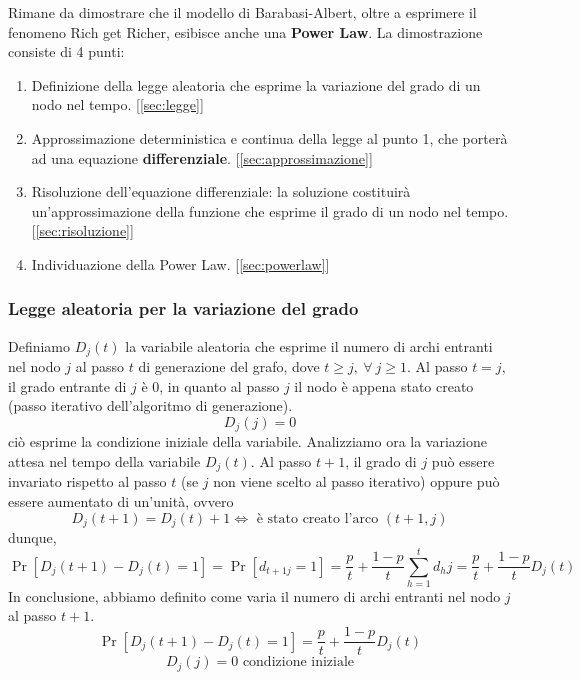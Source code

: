 Rimane da dimostrare che il modello di Barabasi-Albert, oltre a esprimere il fenomeno Rich get Richer, esibisce anche una \textbf{Power Law}. La dimostrazione consiste di 4 punti:
\begin{enumerate}
    \item Definizione della legge aleatoria che esprime la variazione del grado di un nodo nel tempo. [\autoref{sec:legge}]
    \item Approssimazione deterministica e continua della legge al punto 1, che porterà ad una equazione \textbf{differenziale}. [\autoref{sec:approssimazione}]
    \item Risoluzione dell'equazione differenziale: la soluzione costituirà un'approssimazione della funzione che esprime il grado di un nodo nel tempo. [\autoref{sec:risoluzione}]
    \item Individuazione della Power Law. [\autoref{sec:powerlaw}]
\end{enumerate}

\newpage

\subsubsection{Legge aleatoria per la variazione del grado}\label{sec:legge}
\vspace{0.5cm}

\begin{definizione}
    Definiamo $D_j(t)$ la variabile aleatoria che esprime il numero di archi entranti nel nodo $j$ al passo $t$ di generazione del grafo, dove $t \geq j,\ \forall\ j \geq 1$.
    Al passo $t=j$, il grado entrante di $j$ è 0, in quanto al passo $j$ il nodo è appena stato creato (passo iterativo dell'algoritmo di generazione). 
    \[
    D_j(j) = 0
    \]
    ciò esprime la condizione iniziale della variabile.
    Analizziamo ora la variazione attesa nel tempo della variabile $D_j(t)$. Al passo $t+1$, il grado di $j$ può essere invariato rispetto al passo $t$ (se $j$ non viene scelto al passo iterativo) oppure può essere aumentato di un'unità, ovvero
    \[
    D_j(t+1) = D_j(t) + 1 \iff \text{ è stato creato l'arco } (t+1, j)
    \]
    dunque,
    \[
    \Pr[D_j(t+1) - D_j(t) = 1] = \Pr[d_{t+1j} = 1] = \frac{p}{t} + \frac{1-p}{t}\sum_{h=1}^t d_hj = \frac{p}{t} + \frac{1-p}{t} D_j(t)
    \]
    In conclusione, abbiamo definito come varia il numero di archi entranti nel nodo $j$ al passo $t+1$.
    \[
    \Pr[D_j(t+1) - D_j(t) = 1] = \frac{p}{t} + \frac{1-p}{t} D_j(t)
    \]
    \[
    D_j(j) = 0 \text{ condizione iniziale}
    \]
\end{definizione}


